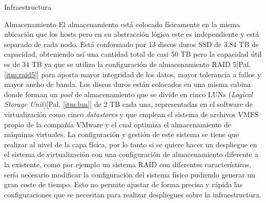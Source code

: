 \begin{section}{Infraestructura}
\begin{subsection}{Almacenamiento}
    El almacenamiento está colocado físicamente en la misma ubicación que los hosts pero en su abstracción lógica este es independiente y está separado de cada nodo. Está conformado por 13 discos duros SSD de 3.84 TB de capacidad, obteniendo así una cantidad total de casi 50 TB pero la capacidad útil es de 34 TB ya que se utiliza la configuración de almacenamiento RAID 5[Pal. \ref{itm:raid5}] para aporta mayor  integridad de los datos, mayor tolerancia a fallos y mayor ancho de banda. Los discos duros están colocados en una misma cabina donde forman un \textit{pool} de almacenamiento que se divide en cinco LUNs (\textit{Logical Storage Unit})[Pal. \ref{itm:lun}] de 2 TB cada una, representadas en el software de virtualización como cinco \textit{datastores} y que emplean el sistema de archivos VMFS propio de la compañía VMware y el cual optimiza el almacenamiento de máquinas virtuales.
    La configuración y gestión de este sistema se tiene que realizar al nivel de la capa física, por lo tanto si se quiere hacer un despliegue en el sistema de virtualización con una configuración de almacenamiento diferente a la existente, como por ejemplo un sistema RAID con diferentes características, sería necesario modificar la configuración del sistema físico pudiendo generar un gran coste de tiempo. Esto no permite ajustar de forma precisa y rápida las configuraciones que se necesitan para realizar despliegues sobre la infraestructura.
\end{subsection}


\end{section}

